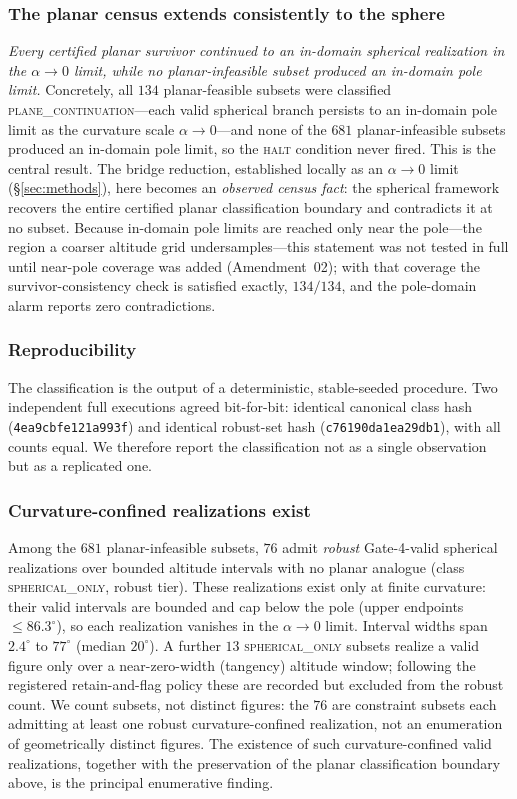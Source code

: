 \documentclass[pdflatex,sn-mathphys-num]{sn-jnl}
\theoremstyle{thmstyleone}%
\theoremstyle{thmstyletwo}%
\theoremstyle{thmstylethree}%
\begin{document}
\label{sec:confirmatory}

\subsubsection{The planar census extends consistently to the sphere}
\emph{Every certified planar survivor continued to an in-domain spherical
realization in the $\alpha\to 0$ limit, while no planar-infeasible subset
produced an in-domain pole limit.} Concretely, all $134$ planar-feasible subsets were classified \textsc{plane\_continuation}---each valid spherical branch persists to an in-domain pole limit as the curvature scale $\alpha\to 0$---and none of the $681$ planar-infeasible subsets produced an in-domain pole limit, so the \textsc{halt} condition never fired. This is the central result. The bridge reduction, established locally as an $\alpha\to 0$ limit
(\S\ref{sec:methods}), here becomes an \emph{observed census fact}: the spherical framework recovers the entire certified planar classification boundary and contradicts it at no subset. Because in-domain pole limits are reached only near the pole---the region a coarser altitude grid undersamples---this statement was not tested in full until near-pole coverage was added (Amendment~02); with that coverage the survivor-consistency check is satisfied exactly, $134/134$, and the pole-domain alarm reports zero contradictions.

\subsubsection{Reproducibility}
The classification is the output of a deterministic, stable-seeded procedure.
Two independent full executions agreed bit-for-bit: identical canonical class
hash (\texttt{4ea9cbfe121a993f}) and identical robust-set hash (\texttt{c76190da1ea29db1}), with all counts equal. We therefore report the
classification not as a single observation but as a replicated one.

\subsubsection{Curvature-confined realizations exist}
Among the $681$ planar-infeasible subsets, $76$ admit \emph{robust} Gate-4-valid spherical realizations over bounded altitude intervals with no planar analogue (class \textsc{spherical\_only}, robust tier). These realizations exist only at finite curvature: their valid intervals are bounded and cap below the pole (upper endpoints $\le 86.3^\circ$), so each realization vanishes in the $\alpha\to 0$ limit. Interval widths span $2.4^\circ$ to $77^\circ$ (median $20^\circ$). A further $13$ \textsc{spherical\_only} subsets realize a valid figure only over a near-zero-width (tangency) altitude window; following the registered retain-and-flag policy these are recorded but excluded from the robust count. We count subsets, not distinct figures: the $76$ are constraint subsets each admitting at least one robust curvature-confined realization, not an enumeration of geometrically distinct figures. The existence of such curvature-confined valid realizations, together with the preservation of the planar classification boundary above, is the principal enumerative finding.
\end{document}
